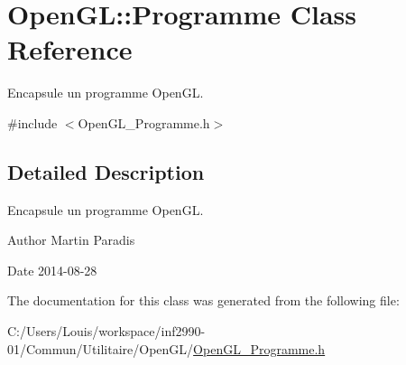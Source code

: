 \hypertarget{class_open_g_l_1_1_programme}{}\section{Open\+G\+L\+:\+:Programme Class Reference}
\label{class_open_g_l_1_1_programme}


Encapsule un programme Open\+G\+L.  




{\ttfamily \#include $<$Open\+G\+L\+\_\+\+Programme.\+h$>$}



\subsection{Detailed Description}
Encapsule un programme Open\+G\+L. 

\begin{DoxyAuthor}{Author}
Martin Paradis 
\end{DoxyAuthor}
\begin{DoxyDate}{Date}
2014-\/08-\/28 
\end{DoxyDate}


The documentation for this class was generated from the following file\+:\begin{DoxyCompactItemize}
\item 
C\+:/\+Users/\+Louis/workspace/inf2990-\/01/\+Commun/\+Utilitaire/\+Open\+G\+L/\hyperlink{_open_g_l___programme_8h}{Open\+G\+L\+\_\+\+Programme.\+h}\end{DoxyCompactItemize}

